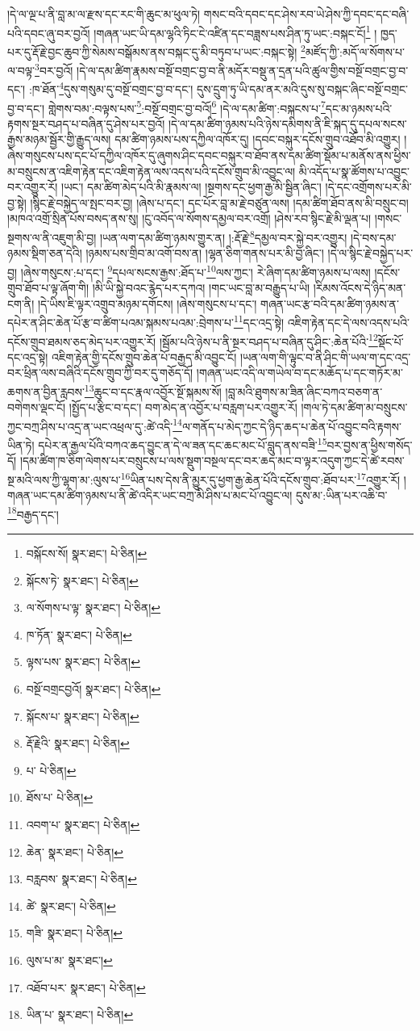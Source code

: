 །དེ་ལ་ལྔ་པ་ནི་བླ་མ་ལ་རྫས་དང་རང་གི་ཆུང་མ་ཕུལ་ཏེ། གསང་བའི་དབང་དང་ཤེས་རབ་ཡེ་ཤེས་ཀྱི་དབང་དང་བཞི་པའི་དབང་ཞུ་བར་བྱའོ། །གཞན་ཡང་ཡི་དམ་ལྷའི་ཏིང་ངེ་འཛིན་དང་བཟླས་པས་ཤིན་ཏུ་ཡང་:བསྐང་ངོ།\footnote{བསྐོངས་སོ།  སྣར་ཐང་།  པེ་ཅིན། } །
ཁྱད་པར་དུ་རྡོ་རྗེ་བྱང་ཆུབ་ཀྱི་སེམས་བསྒོམས་ནས་བསྐང་དུ་མི་བཏུབ་པ་ཡང་:བསྐང་སྟེ། \footnote{སྐོངས་ཏེ་  སྣར་ཐང་།  པེ་ཅིན། }མཛོད་ཀྱི་:མདོ་ལ་སོགས་པ་ལ་བལྟ་\footnote{ལ་སོགས་པ་ལྟ་  སྣར་ཐང་།  པེ་ཅིན། }བར་བྱའོ། །དེ་ལ་དམ་ཚིག་རྣམས་བསྔོ་བགྲང་བྱ་བ་ནི་མདོར་བསྡུ་ན་དྲན་པའི་ཚུལ་གྱིས་བསྔོ་བགྲང་བྱ་བ་དང་། :ཁ་ཐོན་\footnote{ཁ་ཏོན་  སྣར་ཐང་།  པེ་ཅིན། }དུས་གསུམ་དུ་བསྔོ་བགྲང་བྱ་བ་དང་། དུས་དྲུག་ཏུ་ཡི་དམ་ནར་མའི་དུས་སུ་བསྐང་ཞིང་བསྔོ་བགྲང་བྱ་བ་དང་། གླེགས་བམ་:བལྟས་པས་\footnote{ལྟས་པས་  སྣར་ཐང་།  པེ་ཅིན། }:བསྔོ་བགྲང་བྱ་བའོ།\footnote{བསྔོ་བགྲངབྱའོ།  སྣར་ཐང་།  པེ་ཅིན། } །དེ་ལ་དམ་ཚིག་:བསྐངས་པ་\footnote{སྐོངས་པ་  སྣར་ཐང་།  པེ་ཅིན། }དང་མ་ཉམས་པའི་རྟགས་སྔར་བཤད་པ་བཞིན་དུ་ཤེས་པར་བྱའོ། །དེ་ལ་དམ་ཚིག་ཉམས་པའི་ཉེས་དམིགས་ནི་ཇི་སྐད་དུ་དཔལ་སངས་རྒྱས་མཉམ་སྦྱོར་གྱི་རྒྱུད་ལས། དམ་ཚིག་ཉམས་པས་དཀྱིལ་འཁོར་དུ། །དབང་བསྐུར་དངོས་གྲུབ་འཐོབ་མི་འགྱུར། །ཞེས་གསུངས་པས་དང་པོ་དཀྱིལ་འཁོར་དུ་ཞུགས་ཤིང་དབང་བསྐུར་བ་ཐོབ་ནས་དམ་ཚིག་སྡོམ་པ་མནོས་ནས་ཕྱིས་མ་བསྲུངས་ན་འཇིག་རྟེན་དང་འཇིག་རྟེན་ལས་འདས་པའི་དངོས་གྲུབ་མི་འབྱུང་ལ། མི་འདོད་པ་སྣ་ཚོགས་པ་འབྱུང་བར་འགྱུར་རོ། །ཡང་། དམ་ཚིག་མེད་པའི་མི་རྣམས་ལ། །སྔགས་དང་ཕྱག་རྒྱ་མི་སྦྱིན་ཞིང་། །དེ་དང་འགྲོགས་པར་མི་བྱ་སྟེ། །སྙིང་རྗེ་བསྐྱེད་ལ་སྤང་བར་བྱ། །ཞེས་པ་དང་། དང་པོར་བླ་མ་རྗེ་བཙུན་ལས། །དམ་ཚིག་ཐོབ་ནས་མི་བསྲུང་བ། །མཁའ་འགྲོ་སྲིན་པོས་བསད་ནས་སུ། །ངུ་འབོད་ལ་སོགས་དམྱལ་བར་འགྲོ། །ཤེས་རབ་སྙིང་རྗེ་མི་ལྡན་པ། །གསང་སྔགས་ལ་ནི་འཇུག་མི་བྱ། །ཡན་ལག་དམ་ཚིག་ཉམས་གྱུར་ན། །:རྡོ་རྗེ་\footnote{རྡོ་རྗེའི་  སྣར་ཐང་།  པེ་ཅིན། }དམྱལ་བར་སྐྱེ་བར་འགྱུར། །དེ་བས་དམ་ཉམས་སྡིག་ཅན་དེའི། །ཉམས་པས་གྲིབ་མ་འགོ་བས་ན། །ལྷན་ཅིག་གནས་པར་མི་བྱ་ཞིང་། །དེ་ལ་སྙིང་རྗེ་བསྐྱེད་པར་བྱ། །ཞེས་གསུངས་:པ་དང་། \footnote{པ་  པེ་ཅིན། }དཔལ་སངས་རྒྱས་:ཐོད་པ་\footnote{ཐོས་པ་  པེ་ཅིན། }ལས་ཀྱང་། རེ་ཞིག་དམ་ཚིག་ཉམས་པ་ལས། །དངོས་གྲུབ་ཐོབ་པ་ལྟ་ཞོག་གི། །མི་ཡི་སྐྱེ་བའང་རྙེད་པར་དཀའ། །གང་ཡང་བླ་མ་བརྒྱུད་པ་ཡི། །རིམས་འོངས་དེ་ཉིད་མན་ངག་ནི། །དེ་ཡིས་ཇི་ལྟར་འགྲུབ་མཉམ་དགོངས། །ཞེས་གསུངས་པ་དང་། གཞན་ཡང་རྩ་བའི་དམ་ཚིག་ཉམས་ན་དཔེར་ན་ཤིང་ཆེན་པོ་རྩ་བ་ཚིག་པའམ་སྐམས་པའམ་:བྲེགས་པ་\footnote{འབག་པ་  སྣར་ཐང་།  པེ་ཅིན། }དང་འདྲ་སྟེ། འཇིག་རྟེན་དང་དེ་ལས་འདས་པའི་དངོས་གྲུབ་ཐམས་ཅད་མེད་པར་འགྱུར་རོ། །སྦོམ་པའི་ཉེས་པ་ནི་སྔར་བཤད་པ་བཞིན་དུ་ཤིང་:ཆེན་པོའི་\footnote{ཆེན་  སྣར་ཐང་།  པེ་ཅིན། }སྡོང་པོ་དང་འདྲ་སྟེ། འཇིག་རྟེན་གྱི་དངོས་གྲུབ་ཆེན་པོ་བརྒྱད་མི་འབྱུང་ངོ། །ཡན་ལག་གི་ལྟུང་བ་ནི་ཤིང་གི་ཡལ་ག་དང་འདྲ་བར་ཕྲིན་ལས་བཞིའི་དངོས་གྲུབ་ཀྱི་བར་དུ་གཅོད་དོ། །གཞན་ཡང་འདི་ལ་གཡེལ་བ་དང་མཆོད་པ་དང་གཏོར་མ་ཆགས་ན་བྱིན་རླབས་\footnote{བརླབས་  སྣར་ཐང་།  པེ་ཅིན། }ཆུང་བ་དང་རྣལ་འབྱོར་སྔོ་སྐམས་སོ། །བླ་མའི་ཐུགས་མ་ཟིན་ཞིང་བཀའ་བཅག་ན་བགེགས་ལྡང་ངོ། །སྤྱོད་པ་རྩིང་བ་དང་། བག་མེད་ན་འབྱོར་པ་བརླག་པར་འགྱུར་རོ། །གལ་ཏེ་དམ་ཚིག་མ་བསྲུངས་ཀྱང་བཀྲ་ཤིས་པ་འདྲ་ན་ཡང་འཕྲལ་དུ་:ཚེ་འདི་\footnote{ཚེ་  སྣར་ཐང་།  པེ་ཅིན། }ལ་གནོད་པ་མེད་ཀྱང་དེ་ཉིད་ཆད་པ་ཆེན་པོ་འབྱུང་བའི་རྟགས་ཡིན་ཏེ། དཔེར་ན་རྒྱལ་པོའི་བཀའ་ཆད་བྱུང་ན་དེ་ལ་ཟན་དང་ཆང་མང་པོ་བླུད་ནས་བཟི་\footnote{གཟི་  སྣར་ཐང་།  པེ་ཅིན། }བར་བྱས་ན་ཕྱིས་གསོད་དོ། །དམ་ཚིག་ཁ་ཅིག་ལེགས་པར་བསྲུངས་པ་ལས་སྡུག་བསྔལ་དང་བར་ཆད་མང་བ་ལྟར་འདུག་ཀྱང་དེ་ཚེ་རབས་སྔ་མའི་ལས་ཀྱི་ལྷག་མ་:ལུས་པ་\footnote{ལུས་པ་མ་  སྣར་ཐང་། }ཡིན་པས་དེས་ནི་མྱུར་དུ་ཕྱག་རྒྱ་ཆེན་པོའི་དངོས་གྲུབ་:ཐོབ་པར་\footnote{འཐོབ་པར་  སྣར་ཐང་།  པེ་ཅིན། }འགྱུར་རོ། །གཞན་ཡང་དམ་ཚིག་ཉམས་པ་ནི་ཚེ་འདིར་ཡང་བཀྲ་མི་ཤིས་པ་མང་པོ་འབྱུང་ལ། དུས་མ་:ཡིན་པར་འཆི་བ་\footnote{ཡིན་པ་  སྣར་ཐང་།  པེ་ཅིན། }བརྒྱད་དང་། 